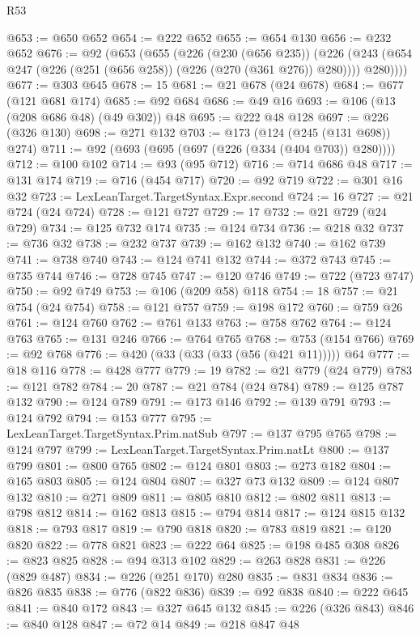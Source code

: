 \begin{lexlean}{R53}
\begin{coremodule}
@653 := @650 @652
@654 := @222 @652
@655 := @654 @130
@656 := @232 @652
@676 := @92
    (@653
      (@655
        (@226
          (@230 (@656 @235))
          (@226 (@243 (@654 @247 (@226 (@251 (@656 @258)) (@226 (@270 (@361 @276)) @280)))) @280))))
@677 := @303 @645
@678 := 15
@681 := @21 @678 (@24 @678)
@684 := @677 (@121 @681 @174)
@685 := @92 @684
@686 := @49 @16
@693 := @106 (@13 (@208 @686 @48) (@49 @302)) @48
@695 := @222 @48 @128
@697 := @226 (@326 @130)
@698 := @271 @132
@703 := @173 (@124 (@245 (@131 @698)) @274)
@711 := @92 (@693 (@695 (@697 (@226 (@334 (@404 @703)) @280))))
@712 := @100 @102
@714 := @93 (@95 @712)
@716 := @714 @686 @48
@717 := @131 @174
@719 := @716 (@454 @717)
@720 := @92 @719
@722 := @301 @16 @32
@723 := LexLeanTarget.TargetSyntax.Expr.second
@724 := 16
@727 := @21 @724 (@24 @724)
@728 := @121 @727
@729 := 17
@732 := @21 @729 (@24 @729)
@734 := @125 @732 @174
@735 := @124 @734
@736 := @218 @32
@737 := @736 @32
@738 := @232 @737
@739 := @162 @132
@740 := @162 @739
@741 := @738 @740
@743 := @124 @741 @132
@744 := @372 @743
@745 := @735 @744
@746 := @728 @745
@747 := @120 @746
@749 := @722 (@723 @747)
@750 := @92 @749
@753 := @106 (@209 @58) @118
@754 := 18
@757 := @21 @754 (@24 @754)
@758 := @121 @757
@759 := @198 @172
@760 := @759 @26
@761 := @124 @760
@762 := @761 @133
@763 := @758 @762
@764 := @124 @763
@765 := @131 @246
@766 := @764 @765
@768 := @753 (@154 @766)
@769 := @92 @768
@776 := @420 (@33 (@33 (@33 (@56 (@421 @11))))) @64
@777 := @18 @116
@778 := @428 @777
@779 := 19
@782 := @21 @779 (@24 @779)
@783 := @121 @782
@784 := 20
@787 := @21 @784 (@24 @784)
@789 := @125 @787 @132
@790 := @124 @789
@791 := @173 @146
@792 := @139 @791
@793 := @124 @792
@794 := @153 @777
@795 := LexLeanTarget.TargetSyntax.Prim.natSub
@797 := @137 @795 @765
@798 := @124 @797
@799 := LexLeanTarget.TargetSyntax.Prim.natLt
@800 := @137 @799
@801 := @800 @765
@802 := @124 @801
@803 := @273 @182
@804 := @165 @803
@805 := @124 @804
@807 := @327 @73 @132
@809 := @124 @807 @132
@810 := @271 @809
@811 := @805 @810
@812 := @802 @811
@813 := @798 @812
@814 := @162 @813
@815 := @794 @814
@817 := @124 @815 @132
@818 := @793 @817
@819 := @790 @818
@820 := @783 @819
@821 := @120 @820
@822 := @778 @821
@823 := @222 @64
@825 := @198 @485 @308
@826 := @823 @825
@828 := @94 @313 @102
@829 := @263 @828
@831 := @226 (@829 @487)
@834 := @226 (@251 @170) @280
@835 := @831 @834
@836 := @826 @835
@838 := @776 (@822 @836)
@839 := @92 @838
@840 := @222 @645
@841 := @840 @172
@843 := @327 @645 @132
@845 := @226 (@326 @843)
@846 := @840 @128
@847 := @72 @14
@849 := @218 @847 @48

\end{coremodule}
\end{lexlean}
